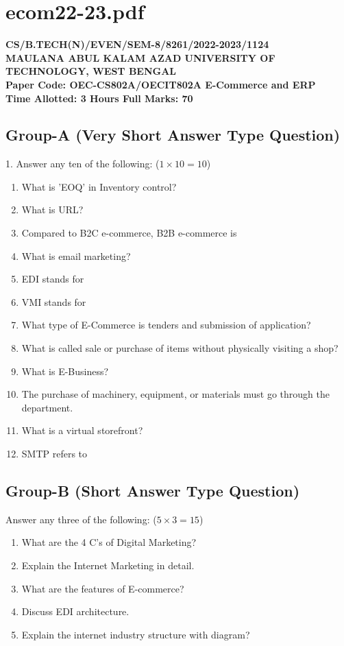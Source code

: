 \newpage
\section*{ecom22-23.pdf}
\textbf{CS/B.TECH(N)/EVEN/SEM-8/8261/2022-2023/1124} \\
\textbf{MAULANA ABUL KALAM AZAD UNIVERSITY OF TECHNOLOGY, WEST BENGAL} \\
\textbf{Paper Code: OEC-CS802A/OECIT802A \hfill E-Commerce and ERP} \\
\textbf{Time Allotted: 3 Hours \hfill Full Marks: 70}

\subsection*{Group-A (Very Short Answer Type Question)}
1. Answer any ten of the following: ($1 \times 10 = 10$)
\begin{enumerate}
    \item[(I)] What is 'EOQ' in Inventory control?
    \item[(II)] What is URL?
    \item[(III)] Compared to B2C e-commerce, B2B e-commerce is \underline{\hspace{2cm}}
    \item[(IV)] What is email marketing?
    \item[(V)] EDI stands for \underline{\hspace{2cm}}
    \item[(VI)] VMI stands for \underline{\hspace{2cm}}
    \item[(VII)] What type of E-Commerce is tenders and submission of application?
    \item[(VIII)] What is called sale or purchase of items without physically visiting a shop?
    \item[(IX)] What is E-Business?
    \item[(X)] The purchase of machinery, equipment, or materials must go through the \underline{\hspace{2cm}} department.
    \item[(XI)] What is a virtual storefront?
    \item[(XII)] SMTP refers to \underline{\hspace{2cm}}
\end{enumerate}

\subsection*{Group-B (Short Answer Type Question)}
Answer any three of the following: ($5 \times 3 = 15$)
\begin{enumerate}
    \item[2.] What are the 4 C's of Digital Marketing?
    \item[3.] Explain the Internet Marketing in detail.
    \item[4.] What are the features of E-commerce?
    \item[5.] Discuss EDI architecture.
    \item[6.] Explain the internet industry structure with diagram?
\end{enumerate}

